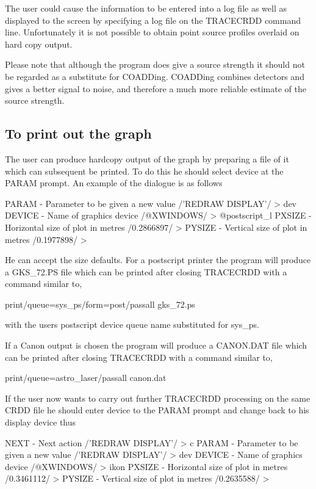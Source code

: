 \documentclass[twoside,11pt]{starlink}
\begin{document}
The user could cause the information to be entered into a log file as well as
displayed to the screen by specifying a log file on the TRACECRDD command line.
Unfortunately it is not possible to obtain point source profiles overlaid on
hard copy output.

Please note that although the program does give a source strength it should not
be regarded as a substitute for COADDing. COADDing combines detectors and gives
a better signal to noise, and therefore a much more reliable estimate of the
source strength.
\subsection{To print out the graph}
The user can produce hardcopy output of the graph by preparing a file of it
which can subsequent be printed. To do this he should select device at the
PARAM prompt. An example of the dialogue is as follows
\begin{small}
\begin{terminalv}
PARAM - Parameter to be given a new value /'REDRAW DISPLAY'/ > dev
DEVICE - Name of graphics device /@XWINDOWS/ > @postscript_l
PXSIZE - Horizontal size of plot in metres /0.2866897/ >
PYSIZE - Vertical size of plot in metres /0.1977898/ >
\end{terminalv}
\end{small}
He can accept the size defaults. For a postscript printer the program will
produce a GKS\_72.PS file which can be printed after closing TRACECRDD with a
command similar to,
\begin{small}
\begin{terminalv}
print/queue=sys_ps/form=post/passall gks_72.ps
\end{terminalv}
\end{small}
with the users postscript device queue name substituted for sys\_ps.

If a Canon output is chosen the program will produce a CANON.DAT file which can
be printed after closing TRACECRDD with a command similar to,
\begin{small}
\begin{terminalv}
print/queue=astro_laser/passall canon.dat
\end{terminalv}
\end{small}
If the user now wants to carry out further TRACECRDD processing on the same CRDD
file he should enter device to the PARAM prompt and change back to his display
device thus
\begin{small}
\begin{terminalv}
NEXT - Next action /'REDRAW DISPLAY'/ > c
PARAM - Parameter to be given a new value /'REDRAW DISPLAY'/ > dev
DEVICE - Name of graphics device /@XWINDOWS/ > ikon
PXSIZE - Horizontal size of plot in metres /0.3461112/ >
PYSIZE - Vertical size of plot in metres /0.2635588/ >
\end{terminalv}
\end{small}
\end{document}

